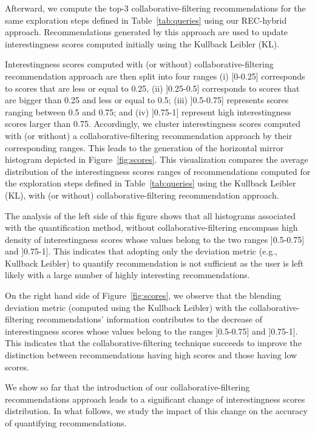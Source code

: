 Afterward, we compute the top-3 collaborative-filtering recommendations for the same exploration steps defined in Table~\ref{tab:queries} using our REC-hybrid approach. Recommendations generated by this approach are used to update interestingness scores computed initially using the Kullback Leibler (KL).

Interestingness scores computed with (or without) collaborative-filtering recommendation approach are then split into four ranges (i) [0-0.25] corresponds to scores that are less or equal to 0.25, (ii) ]0.25-0.5] corresponds to scores that are bigger than 0.25 and less or equal to 0.5; (iii) ]0.5-0.75] represents scores ranging between 0.5 and 0.75; and (iv) ]0.75-1] represent high interestingness scores larger than 0.75. 
Accordingly, we cluster interestingness scores computed with (or without) a collaborative-filtering recommendation approach by their corresponding ranges.
This leads to the generation of the horizontal mirror histogram depicted in Figure~\ref{fig:scores}.
This visualization compares the average distribution of the interestingness scores ranges of recommendations computed  for the exploration steps defined in Table~\ref{tab:queries} using the Kullback Leibler (KL), with (or without) collaborative-filtering recommendation approach. %




The analysis of the left side of this figure shows that all histograms associated with the quantification method, without collaborative-filtering encompass high density of interestingness scores whose values belong to the two ranges ]0.5-0.75] and ]0.75-1]. 
This indicates that adopting only the deviation metric (e.g., Kullback Leibler) to quantify recommendation is not sufficient as the user is left likely with a large number of highly interesting recommendations.

On the right hand side of Figure~\ref{fig:scores}, we observe that the blending deviation metric (computed using the Kullback Leibler) with the collaborative-filtering recommendations' information contributes to the decrease of interestingness scores whose values belong to the ranges ]0.5-0.75] and ]0.75-1].
This indicates that the collaborative-filtering technique succeeds to improve the distinction between recommendations having high scores and those having low scores.






We show so far that the introduction of our collaborative-filtering recommendations approach leads to a significant change of interestingness scores distribution. 
In what follows, we study the impact of this change on the accuracy of quantifying recommendations.

